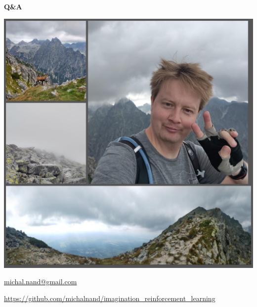 \documentclass[xcolor=dvipsnames]{beamer}
\begin{document}
\begin{frame}{\bf Q\&A}

{\centering \includegraphics[scale=0.1]{../images/me.jpg}}

\url{michal.nand@gmail.com}

\url{https://github.com/michalnand/imagination_reinforcement_learning}

 
\end{frame}
\end{document}
